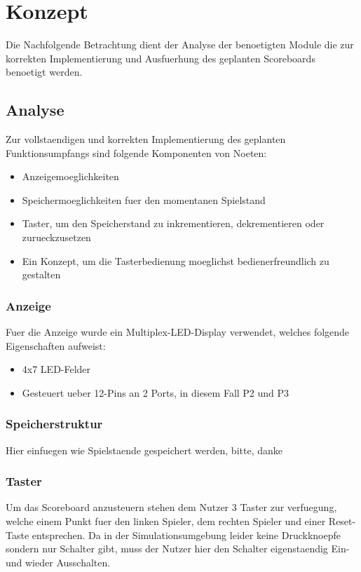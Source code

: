 \chapter{Konzept}
Die Nachfolgende Betrachtung dient der Analyse der benoetigten Module die zur korrekten Implementierung und Ausfuerhung des geplanten Scoreboards benoetigt werden.\\

\section{Analyse}
Zur vollstaendigen und korrekten Implementierung des geplanten Funktionsumpfangs sind folgende Komponenten von Noeten:
\begin{itemize}
	\item Anzeigemoeglichkeiten
	\item Speichermoeglichkeiten fuer den momentanen Spielstand
	\item Taster, um den Speicherstand zu inkrementieren, dekrementieren oder zurueckzusetzen
	\item Ein Konzept, um die Tasterbedienung moeglichst bedienerfreundlich zu gestalten
\end{itemize}

\subsection{Anzeige}
Fuer die Anzeige wurde ein Multiplex-LED-Display verwendet, welches folgende Eigenschaften aufweist:
\begin{itemize}
	\item 4x7 LED-Felder
	\item Gesteuert ueber 12-Pins an 2 Ports, in diesem Fall P2 und P3
\end{itemize}

\subsection{Speicherstruktur}
Hier einfuegen wie Spielstaende gespeichert werden, bitte, danke

\subsection{Taster}
Um das Scoreboard anzusteuern stehen dem Nutzer 3 Taster zur verfuegung, welche einem Punkt fuer den linken Spieler, dem rechten Spieler und einer Reset-Taste entsprechen. Da in der Simulationsumgebung leider keine Druckknoepfe sondern nur Schalter gibt, muss der Nutzer hier den Schalter eigenstaendig Ein- und wieder Ausschalten.

